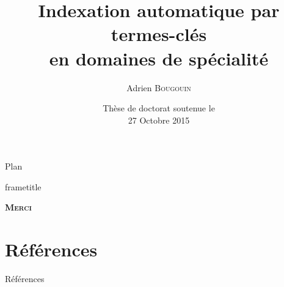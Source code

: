\documentclass[10pt, xcolor={usenames, dvipsnames}]{beamer}
\title{Indexation automatique par termes-clés\\en domaines de spécialité}
\author{Adrien \textsc{Bougouin}}
\institute{\normalsize{Université de Nantes, LINA}}
\date{Thèse de doctorat soutenue le\\27 Octobre 2015}
\begin{document}

  \begin{frame}
    \titlepage
  \end{frame}

  
  \begin{frame}{Plan}
    \tableofcontents
  \end{frame}
  
  
  
  \begin{frame}
    \vfill
    \begin{beamercolorbox}[center,shadow=false,rounded=false]{frametitle} 
      \vspace{.15em}\par
      \Huge{\textbf{\textsc{Merci}}}
      \vspace{.5em}
    \end{beamercolorbox}
    \vfill
  \end{frame}
  \section*{Références}
    \begin{frame}[allowframebreaks]{Références}
      \def\newblock{\hskip .11em plus .33em minus .07em}
      
      
    \end{frame}
\end{document}
